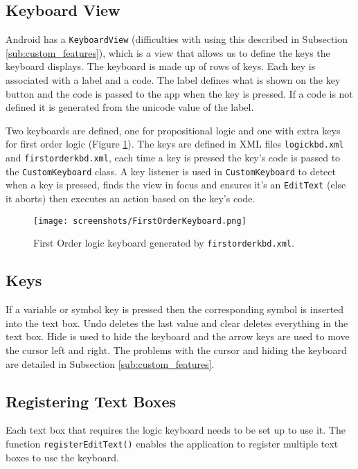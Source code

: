 \documentclass{report}
\begin{document}
\subsection{Keyboard View}

Android has a {\tt KeyboardView} (difficulties with using this described in Subsection \ref{sub:custom_features}), which is a view that allows us to define the keys the keyboard displays. The keyboard is made up of rows of keys. Each key is associated with a label and a code. The label defines what is shown on the key button and the code is passed to the app when the key is pressed. If a code is not defined it is generated from the unicode value of the label.

Two keyboards are defined, one for propositional logic and one with extra keys for first order logic (Figure \ref{firstorderkeyboard}). The keys are defined in XML files {\tt logickbd.xml} and {\tt firstorderkbd.xml}, each time a key is pressed the key's code is passed to the {\tt CustomKeyboard} class. A key listener is used in {\tt CustomKeyboard} to detect when a key is pressed, finds the view in focus and ensures it's an {\tt EditText} (else it aborts) then executes an action based on the key's code.

\begin{figure}[ht!]
    \centering
    \texttt{[image: screenshots/FirstOrderKeyboard.png]}
    \caption{First Order logic keyboard generated by {\tt firstorderkbd.xml}.}
    \label{firstorderkeyboard}
\end{figure}

\subsection{Keys}

If a variable or symbol key is pressed then the corresponding symbol is inserted into the text box. Undo deletes the last value and clear deletes everything in the text box. Hide is used to hide the keyboard and the arrow keys are used to move the cursor left and right. The problems with the cursor and hiding the keyboard are detailed in Subsection \ref{sub:custom_features}.

\subsection{Registering Text Boxes}

Each text box that requires the logic keyboard needs to be set up to use it. The function {\tt registerEditText()} enables the application to register multiple text boxes to use the keyboard.
\end{document}
